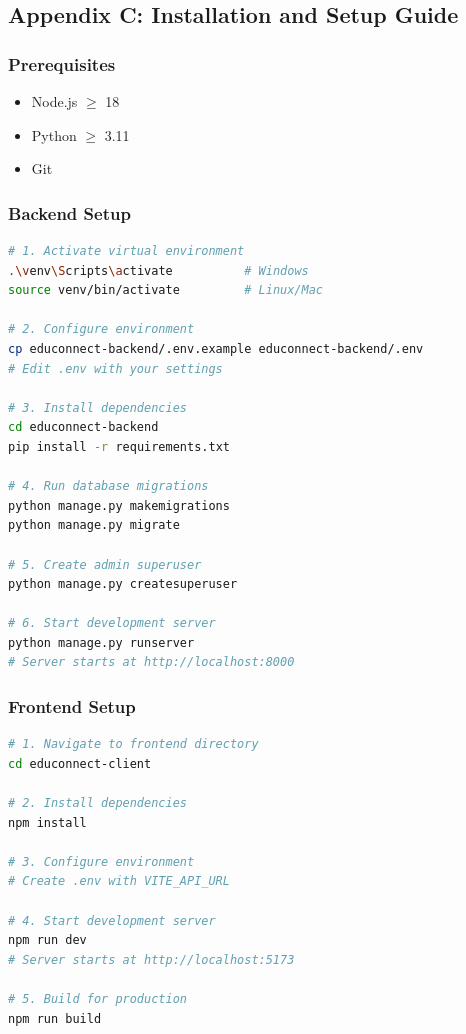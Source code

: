 \newpage
\subsection*{Appendix C: Installation and Setup Guide}

\subsubsection*{Prerequisites}
\begin{itemize}[leftmargin=2em]
    \item Node.js $\geq$ 18
    \item Python $\geq$ 3.11
    \item Git
\end{itemize}

\subsubsection*{Backend Setup}
\begin{lstlisting}[language=bash, caption={Backend Setup Commands}]
# 1. Activate virtual environment
.\venv\Scripts\activate          # Windows
source venv/bin/activate         # Linux/Mac

# 2. Configure environment
cp educonnect-backend/.env.example educonnect-backend/.env
# Edit .env with your settings

# 3. Install dependencies
cd educonnect-backend
pip install -r requirements.txt

# 4. Run database migrations
python manage.py makemigrations
python manage.py migrate

# 5. Create admin superuser
python manage.py createsuperuser

# 6. Start development server
python manage.py runserver
# Server starts at http://localhost:8000
\end{lstlisting}

\subsubsection*{Frontend Setup}
\begin{lstlisting}[language=bash, caption={Frontend Setup Commands}]
# 1. Navigate to frontend directory
cd educonnect-client

# 2. Install dependencies
npm install

# 3. Configure environment
# Create .env with VITE_API_URL

# 4. Start development server
npm run dev
# Server starts at http://localhost:5173

# 5. Build for production
npm run build
\end{lstlisting}


